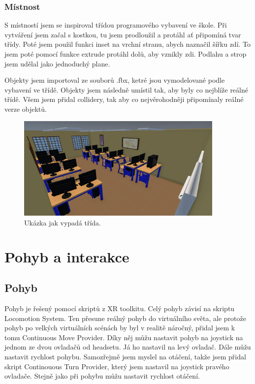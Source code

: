 \documentclass[12pt, a4paper,
twoside,        %
openright
]{report}
\begin{document}
\subsubsection{Místnost}
S místností jsem se inspiroval třídou programového vybavení ve škole. Při vytváření jsem začal s kostkou, tu jsem prodloužil a protáhl ať připomíná tvar třídy. Poté jsem použil funkci inset na vrchní stranu, abych naznačil šířku zdí. To jsem poté pomocí funkce extrude protáhl dolů, aby vznikly zdi. Podlahu a strop jsem udělal jako jednoduchý plane.

Objekty jsem importoval ze souborů .fbx, ketré jsou vymodelované podle vybavení ve třídě. Objekty jsem následně umístil tak, aby byly co nejblíže reálné třídě. Všem jsem přidal collidery, tak aby co nejvěrohodněji připomínaly reálné verze objektů.

\begin{figure}[H]
	\centering
	\includegraphics[width=0.9\textwidth]{image/classroom.png}
	\caption{Ukázka jak vypadá třída.}
	\label{fig:trida}
\end{figure}

\newpage

\section {Pohyb a interakce}
\label{sec:pohyb_a_interakce}
\subsection{Pohyb}
 Pohyb je řešený pomocí skriptů z XR toolkitu. Celý pohyb závisí na skriptu Locomotion System. Ten přesune reálný pohyb do virtuálního světa, ale protože pohyb po velkých virtuálních scénách by byl v realitě náročný, přidal jsem k tomu Continuous Move Provider. Díky něj můžu nastavit pohyb na joystick na jednom ze dvou ovladačů od headsetu. Já ho nastavil na levý ovladač. Dále můžu nastavit rychlost pohybu. Samozřejmě jsem myslel na otáčení, takže jsem přidal skript Continouous Turn Provider, který jsem nastavil na joystick pravého ovladače. Stejně jako při pohybu můžu nastavit rychlost otáčení.
\end{document}
